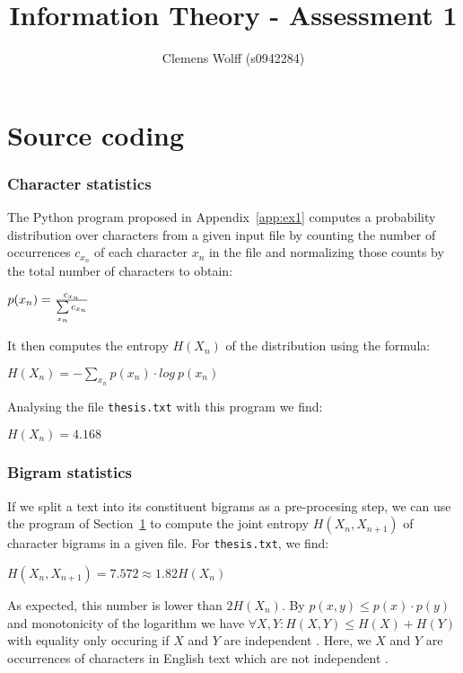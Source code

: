 \documentclass[10pt,a4paper,twoside,twocolumn]{article}
\title{Information Theory - Assessment 1}
\author{Clemens Wolff (s0942284)}
\date{\vspace{-2em}}
\newcommand*{\thesisTXT}{{\tt thesis.txt}\xspace}
\begin{document}
\maketitle


\part{Source coding}

\section{Character statistics}\label{sec:ex1}
The Python program proposed in Appendix~\ref{app:ex1} computes a probability
distribution over characters from a given input file by counting the number of
occurrences $c_{x_n}$ of each character $x_n$ in the file and normalizing those
counts by the total number of characters to obtain:

\begin{center}
    $p(x_n) = {c_{x_n} \over\sum\limits_{x_n} c_{x_n}}$
\end{center}

It then computes the entropy $H(X_n)$ of the distribution using the formula:

\begin{center}
    $H(X_n) = -\sum\limits_{x_n} p(x_n) \cdot log~p(x_n)$
\end{center}

Analysing the file \thesisTXT with this program we find:

\begin{center}
    $H(X_n) = 4.168$
\end{center}

\section{Bigram statistics}\label{sec:ex2}
If we split a text into its constituent bigrams as a pre-procesing step, we can
use the program of Section~\ref{sec:ex1} to compute the joint entropy $H(X_n,
X_{n+1})$ of character bigrams in a given file. For \thesisTXT, we find:

\begin{center}
    $H(X_n, X_{n+1}) = 7.572 \approx 1.82H(X_n)$
\end{center}

As expected, this number is lower than $2H(X_n)$. By $p(x,y) \le p(x) \cdot
p(y)$ and monotonicity of the logarithm we have $\forall X,Y: H(X, Y) \le H(X) +
H(Y)$ with equality only occuring if $X$ and $Y$ are independent
\cite[p.~138]{mackay}. Here, we $X$ and $Y$ are occurrences of characters in
English text which are not independent \cite[p.~22-24]{mackay}.
\end{document}
